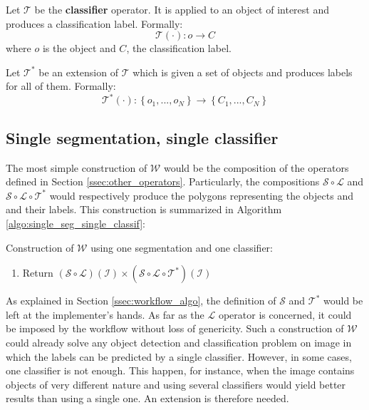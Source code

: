 \begin{definition} \label{def:classif_op}
Let $\mathcal{T}$ be the \textbf{classifier} operator. It is applied to an object of interest and produces a classification label. Formally:
\begin{equation}
	\mathcal{T}(\cdot) : o \rightarrow C
\end{equation}
where $o$ is the object and $C$, the classification label. 
\end{definition}
\begin{definition}
Let $\mathcal{T}^*$ be an extension of $\mathcal{T}$ which is given a set of objects and produces labels for all of them. Formally: 
\begin{equation}
	\mathcal{T}^*(\cdot) : \left\{o_1, ..., o_N\right\}  \rightarrow \left\{C_1, ..., C_N\right\}
\end{equation}
\end{definition}

\subsection{Single segmentation, single classifier}
\label{ssec:single_single}

The most simple construction of $\mathcal{W}$ would be the composition of the operators defined in Section \ref{ssec:other_operators}. Particularly, the compositions $\mathcal{S} \circ \mathcal{L}$ and $\mathcal{S} \circ \mathcal{L} \circ \mathcal{T}^*$ would respectively produce the polygons representing the objects and and their labels. This construction is summarized in Algorithm \ref{algo:single_seg_single_classif}: 

\begin{algorithm} \label{algo:single_seg_single_classif} 
	Construction of $\mathcal{W}$ using one segmentation and one classifier:
	
	\begin{enumerate}
		\item Return $\left(\mathcal{S} \circ \mathcal{L}\right)\left(\mathcal{I}\right) \times \left(\mathcal{S} \circ \mathcal{L} \circ \mathcal{T}^*\right)\left(\mathcal{I}\right)$
	\end{enumerate}
\end{algorithm}

As explained in Section \ref{ssec:workflow_algo}, the definition of $\mathcal{S}$ and $\mathcal{T}^*$ would be left at the implementer's hands. As far as the $\mathcal{L}$ operator is concerned, it could be imposed by the workflow without loss of genericity. Such a construction of $\mathcal{W}$ could already solve any object detection and classification problem on image in which the labels can be predicted by a single classifier. However, in some cases, one classifier is not enough. This happen, for instance, when the image contains objects of very different nature and using several classifiers would yield better results than using a single one. An extension is therefore needed.

